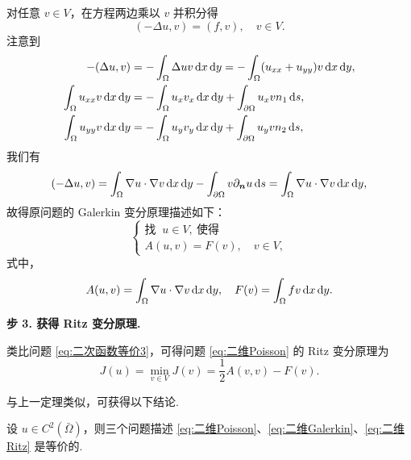 对任意 $v \in V$，在方程两边乘以 $v$ 并积分得
\begin{equation*}
    (-\Delta u, v) = (f, v), \quad v \in V.
\end{equation*}
注意到
\begin{align*}
    -(\Delta u, v) &= -\int_{\Omega} \Delta u v \d x\d y = -\int_{\Omega} (u_{xx} + u_{yy}) v \d x\d y, \\
    \int_{\Omega} u_{xx} v \d x\d y &= -\int_{\Omega} u_x v_x \d x\d y + \int_{\partial\Omega} u_x v n_1 \d s, \\
    \int_{\Omega} u_{yy} v \d x\d y &= -\int_{\Omega} u_y v_y \d x\d y + \int_{\partial\Omega} u_y v n_2 \d s,
\end{align*}
我们有
\begin{equation*}
    (-\Delta u, v) = \int_{\Omega} \nabla u \cdot \nabla v \mathop{}\!\mathrm{d} x\mathop{}\!\mathrm{d} y - \int_{\partial\Omega} v \partial_{\bm{n}} u \mathop{}\!\mathrm{d} s = \int_{\Omega} \nabla u \cdot \nabla v \mathop{}\!\mathrm{d} x\mathop{}\!\mathrm{d} y,
\end{equation*}
故得原问题的 Galerkin 变分原理描述如下：
\begin{equation}\label{eq:二维Galerkin}
    \begin{cases}
        \text{找 }\ u \in V,\ \text{使得} \\
        A(u, v) = F(v), \quad v \in V,
    \end{cases}
\end{equation}
式中，
\begin{equation*}
    A(u, v) = \int_{\Omega} \nabla u \cdot \nabla v \mathop{}\!\mathrm{d} x\mathop{}\!\mathrm{d} y, \quad F(v) = \int_{\Omega} fv \mathop{}\!\mathrm{d} x\mathop{}\!\mathrm{d} y.
\end{equation*}

\noindent\textbf{步 3. 获得 Ritz 变分原理.}

类比问题 \eqref{eq:二次函数等价3}，可得问题 \eqref{eq:二维Poisson} 的 Ritz 变分原理为
\begin{equation}\label{eq:二维Ritz}
    J(u) = \min_{v \in V} J(v) = \frac{1}{2} A(v, v) - F(v).
\end{equation}


与上一定理类似，可获得以下结论.
\begin{theorem}
设 $u \in C^2(\bar{\Omega})$，则三个问题描述 \eqref{eq:二维Poisson}、\eqref{eq:二维Galerkin}、\eqref{eq:二维Ritz} 是等价的.
\end{theorem}

